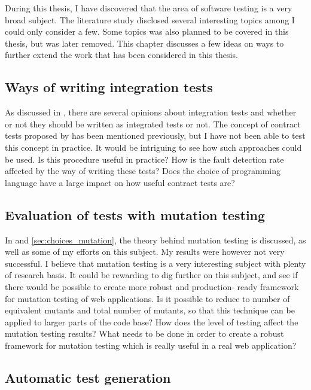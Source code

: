 
During this thesis, I have discovered that the area of software testing
is a very broad subject. The literature study disclosed several
interesting topics among I could only consider a few. Some topics was
also planned to be covered in this thesis, but was later removed. This
chapter discusses a few ideas on ways to further extend the work that
has been considered in this thesis.\\


\subsection{Ways of writing integration tests}

As discussed in , there are several
opinions about integration tests and whether or not they should be
written as  integrated tests or not. The concept of contract tests
proposed by \citet{video:integrated_scam} has been mentioned previously,
but I have not been able to test this concept in practice. It would be
intriguing to see how such approaches could be used. Is this procedure
useful in practice? How is the fault detection rate affected by the way
of writing these tests? Does the choice of programming language have a
large impact on how useful contract tests are?\\


\subsection{Evaluation of tests with mutation testing}

In  and \ref{sec:choices_mutation}, the theory
behind mutation testing is discussed, as well as some of my efforts on
this subject. My results were however not very successful. I believe
that mutation testing is a very interesting subject with plenty of
research basis. It could be rewarding to dig further on this subject,
and see if there would be possible to create more robust and production-
ready framework for mutation testing of web applications. Is it possible
to reduce to number of equivalent mutants and total number of mutants,
so that  this technique can be applied to larger parts of the code base?
How does the level of testing affect the mutation testing results? What
needs to be done in order to create a robust framework for mutation
testing which is really useful in a real web application?\\


\subsection{Automatic test generation}

